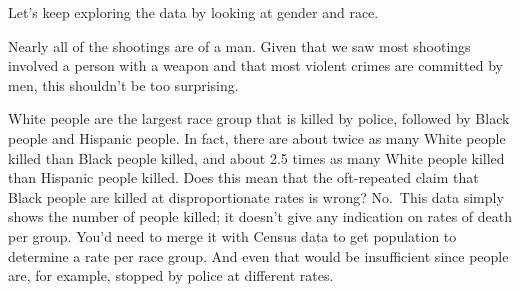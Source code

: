 \documentclass[
]{krantz}
\makeatletter
\newenvironment{Shaded}{\begin{snugshade}}{\end{snugshade}}
\newcommand{\AttributeTok}[1]{\textcolor[rgb]{0.61,0.61,0.61}{#1}}
\newcommand{\CommentTok}[1]{\textcolor[rgb]{0.37,0.37,0.37}{\textit{#1}}}
\newcommand{\DecValTok}[1]{\textcolor[rgb]{0.06,0.06,0.06}{#1}}
\newcommand{\FunctionTok}[1]{\textcolor[rgb]{0,0,0}{#1}}
\newcommand{\NormalTok}[1]{#1}
\newcommand{\OtherTok}[1]{\textcolor[rgb]{0.37,0.37,0.37}{#1}}
\newcommand{\SpecialCharTok}[1]{\textcolor[rgb]{0,0,0}{#1}}
\newenvironment{kframe}{%
\medskip{}
\setlength{\fboxsep}{.8em}
 \def\at@end@of@kframe{}%
 \ifinner\ifhmode%
  \def\at@end@of@kframe{\end{minipage}}%
  \begin{minipage}{\columnwidth}%
 \fi\fi%
 \def\FrameCommand##1{\hskip\@totalleftmargin \hskip-\fboxsep
 \colorbox{shadecolor}{##1}\hskip-\fboxsep
     \hskip-\linewidth \hskip-\@totalleftmargin \hskip\columnwidth}%
 \MakeFramed {\advance\hsize-\width
   \@totalleftmargin\z@ \linewidth\hsize
   \@setminipage}}%
 {\par\unskip\endMakeFramed%
 \at@end@of@kframe}
\renewenvironment{Shaded}{\begin{kframe}}{\end{kframe}}
\makeatother
\begin{document}
Let's keep exploring the data by looking at gender and race.

\begin{Shaded}
\end{Shaded}

Nearly all of the shootings are of a man. Given that we saw
most shootings involved a person with a weapon and that most
violent crimes are committed by men, this shouldn't be too
surprising.

\begin{Shaded}
\end{Shaded}

White people are the largest race group that is killed by
police, followed by Black people and Hispanic people. In
fact, there are about twice as many White people killed than
Black people killed, and about 2.5 times as many White
people killed than Hispanic people killed. Does this mean
that the oft-repeated claim that Black people are killed at
disproportionate rates is wrong? No.~This data simply shows
the number of people killed; it doesn't give any indication
on rates of death per group. You'd need to merge it with
Census data to get population to determine a rate per race
group. And even that would be insufficient since people are,
for example, stopped by police at different rates.
\end{document}
